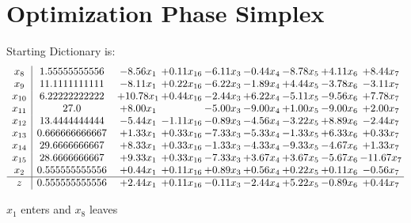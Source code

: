 \documentclass[9pt]{article}
\begin{document}
\section{Optimization Phase Simplex}
Starting Dictionary is:
\[\begin{array}{c| c c@{\hskip 2pt} c@{\hskip 2pt} c@{\hskip 2pt} c@{\hskip 2pt} c@{\hskip 2pt} c@{\hskip 2pt} c@{\hskip 2pt} }
 x_{8}   &  1.55555555556 & -8.56 x_{1} & +  0.11 x_{16} & -6.11 x_{3} & -0.44 x_{4} & -8.78 x_{5} & +  4.11 x_{6} & +  8.44 x_{7}\\
 x_{9}   &  11.1111111111 & -8.11 x_{1} & +  0.22 x_{16} & -6.22 x_{3} & -1.89 x_{4} & +  4.44 x_{5} & -3.78 x_{6} & -3.11 x_{7}\\
 x_{10}   &  6.22222222222 & + 10.78 x_{1} & +  0.44 x_{16} & -2.44 x_{3} & +  6.22 x_{4} & -5.11 x_{5} & -9.56 x_{6} & +  7.78 x_{7}\\
 x_{11}   &  27.0 & +  8.00 x_{1} &   & -5.00 x_{3} & -9.00 x_{4} & +  1.00 x_{5} & -9.00 x_{6} & +  2.00 x_{7}\\
 x_{12}   &  13.4444444444 & -5.44 x_{1} & -1.11 x_{16} & -0.89 x_{3} & -4.56 x_{4} & -3.22 x_{5} & +  8.89 x_{6} & -2.44 x_{7}\\
 x_{13}   &  0.666666666667 & +  1.33 x_{1} & +  0.33 x_{16} & -7.33 x_{3} & -5.33 x_{4} & -1.33 x_{5} & +  6.33 x_{6} & +  0.33 x_{7}\\
 x_{14}   &  29.6666666667 & +  8.33 x_{1} & +  0.33 x_{16} & -1.33 x_{3} & -4.33 x_{4} & -9.33 x_{5} & -4.67 x_{6} & +  1.33 x_{7}\\
 x_{15}   &  28.6666666667 & +  9.33 x_{1} & +  0.33 x_{16} & -7.33 x_{3} & +  3.67 x_{4} & +  3.67 x_{5} & -5.67 x_{6} & -11.67 x_{7}\\
 x_{2}   &  0.555555555556 & +  0.44 x_{1} & +  0.11 x_{16} & +  0.89 x_{3} & +  0.56 x_{4} & +  0.22 x_{5} & +  0.11 x_{6} & -0.56 x_{7}\\
\hline
z    &  0.555555555556 & +  2.44 x_{1} & +  0.11 x_{16} & -0.11 x_{3} & -2.44 x_{4} & +  5.22 x_{5} & -0.89 x_{6} & +  0.44 x_{7}\\
\end{array}\]


 $ x_{1} $ enters and $ x_{8} $ leaves 
\end{document}
